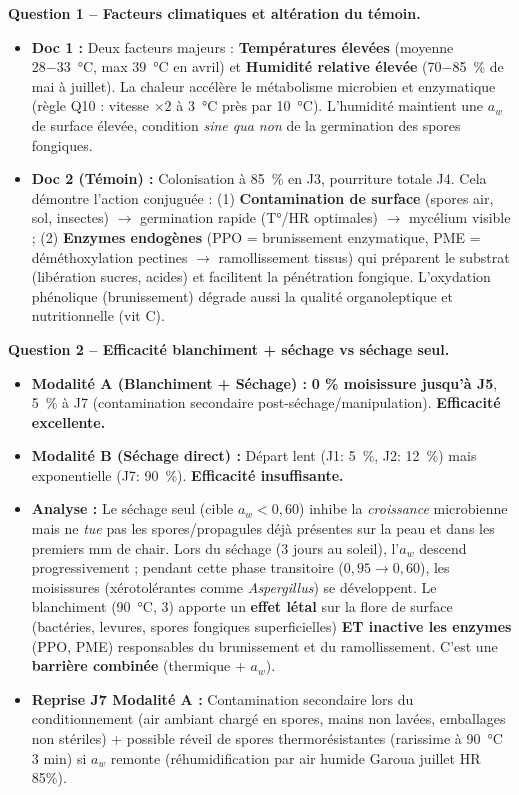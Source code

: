 \documentclass[11pt]{article}
\begin{document}
\begin{exoresolu}
\textbf{Question 1 -- Facteurs climatiques et altération du témoin.}
\begin{itemize}
    \item \textbf{Doc 1 :} Deux facteurs majeurs : \textbf{Températures élevées} (moyenne \SI{28-33}{\celsius}, max \SI{39}{\celsius} en avril) et \textbf{Humidité relative élevée} (\SI{70-85}{\%} de mai à juillet). La chaleur accélère le métabolisme microbien et enzymatique (règle Q10 : vitesse $\times 2$ à \SI{3}{\celsius} près par \SI{10}{\celsius}). L'humidité maintient une $a_w$ de surface élevée, condition \emph{sine qua non} de la germination des spores fongiques.
    \item \textbf{Doc 2 (Témoin) :} Colonisation à \SI{85}{\%} en J3, pourriture totale J4. Cela démontre l'action conjuguée : (1) \textbf{Contamination de surface} (spores air, sol, insectes) $\rightarrow$ germination rapide (T°/HR optimales) $\rightarrow$ mycélium visible ; (2) \textbf{Enzymes endogènes} (PPO = brunissement enzymatique, PME = déméthoxylation pectines $\rightarrow$ ramollissement tissus) qui préparent le substrat (libération sucres, acides) et facilitent la pénétration fongique. L'oxydation phénolique (brunissement) dégrade aussi la qualité organoleptique et nutritionnelle (vit C).
\end{itemize}

\textbf{Question 2 -- Efficacité blanchiment + séchage vs séchage seul.}
\begin{itemize}
    \item \textbf{Modalité A (Blanchiment + Séchage) :} \textbf{0 \% moisissure jusqu'à J5}, \SI{5}{\%} à J7 (contamination secondaire post-séchage/manipulation). \textbf{Efficacité excellente.}
    \item \textbf{Modalité B (Séchage direct) :} Départ lent (J1: \SI{5}{\%}, J2: \SI{12}{\%}) mais exponentielle (J7: \SI{90}{\%}). \textbf{Efficacité insuffisante.}
    \item \textbf{Analyse :} Le séchage seul (cible $a_w < 0,60$) inhibe la \emph{croissance} microbienne mais ne \emph{tue} pas les spores/propagules déjà présentes sur la peau et dans les premiers mm de chair. Lors du séchage (3 jours au soleil), l'$a_w$ descend progressivement ; pendant cette phase transitoire ($0,95 \rightarrow 0,60$), les moisissures (xérotolérantes comme \emph{Aspergillus}) se développent. Le blanchiment (\SI{90}{\celsius}, \SI{3}{\min}) apporte un \textbf{effet létal} sur la flore de surface (bactéries, levures, spores fongiques superficielles) \textbf{ET inactive les enzymes} (PPO, PME) responsables du brunissement et du ramollissement. C'est une \textbf{barrière combinée} (thermique + $a_w$).
    \item \textbf{Reprise J7 Modalité A :} Contamination secondaire lors du conditionnement (air ambiant chargé en spores, mains non lavées, emballages non stériles) + possible réveil de spores thermorésistantes (rarissime à \SI{90}{\celsius} 3 min) si $a_w$ remonte (réhumidification par air humide Garoua juillet HR 85\%).
\end{itemize}


\end{exoresolu}
\end{document}
